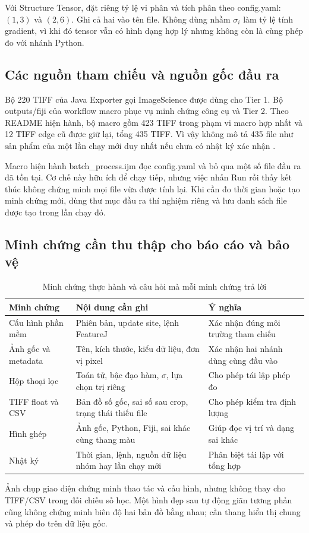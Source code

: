 Với Structure Tensor, đặt riêng tỷ lệ vi phân và tích phân theo config.yaml: $(1,3)$ và $(2,6)$. Ghi cả hai vào tên file. Không dùng nhầm $\sigma_i$ làm tỷ lệ tính gradient, vì khi đó tensor vẫn có hình dạng hợp lý nhưng không còn là cùng phép đo với nhánh Python.

\subsection{Các nguồn tham chiếu và nguồn gốc đầu ra}
Bộ 220 TIFF của Java Exporter gọi ImageScience được dùng cho Tier 1. Bộ outputs/fiji của workflow macro phục vụ minh chứng công cụ và Tier 2. Theo README hiện hành, bộ macro gồm 423 TIFF trong phạm vi macro hợp nhất và 12 TIFF edge cũ được giữ lại, tổng 435 TIFF. Vì vậy không mô tả 435 file như sản phẩm của một lần chạy mới duy nhất nếu chưa có nhật ký xác nhận \cite{xlaRepository}.

Macro hiện hành batch\_process.ijm đọc config.yaml và bỏ qua một số file đầu ra đã tồn tại. Cơ chế này hữu ích để chạy tiếp, nhưng việc nhấn Run rồi thấy kết thúc không chứng minh mọi file vừa được tính lại. Khi cần đo thời gian hoặc tạo minh chứng mới, dùng thư mục đầu ra thí nghiệm riêng và lưu danh sách file được tạo trong lần chạy đó.

\subsection{Minh chứng cần thu thập cho báo cáo và bảo vệ}
\begin{table}[t]
\centering
\caption{Minh chứng thực hành và câu hỏi mà mỗi minh chứng trả lời}
\begin{tabularx}{\textwidth}{lXX}
\toprule
Minh chứng & Nội dung cần ghi & Ý nghĩa\\
\midrule
Cấu hình phần mềm & Phiên bản, update site, lệnh FeatureJ & Xác nhận đúng môi trường tham chiếu\\
Ảnh gốc và metadata & Tên, kích thước, kiểu dữ liệu, đơn vị pixel & Xác nhận hai nhánh dùng cùng đầu vào\\
Hộp thoại lọc & Toán tử, bậc đạo hàm, $\sigma$, lựa chọn trị riêng & Cho phép tái lập phép đo\\
TIFF float và CSV & Bản đồ số gốc, sai số sau crop, trạng thái thiếu file & Cho phép kiểm tra định lượng\\
Hình ghép & Ảnh gốc, Python, Fiji, sai khác cùng thang màu & Giúp đọc vị trí và dạng sai khác\\
Nhật ký & Thời gian, lệnh, nguồn dữ liệu nhóm hay lần chạy mới & Phân biệt tái lập với tổng hợp\\
\bottomrule
\end{tabularx}
\end{table}
Ảnh chụp giao diện chứng minh thao tác và cấu hình, nhưng không thay cho TIFF/CSV trong đối chiếu số học. Một hình đẹp sau tự động giãn tương phản cũng không chứng minh biên độ hai bản đồ bằng nhau; cần thang hiển thị chung và phép đo trên dữ liệu gốc.
